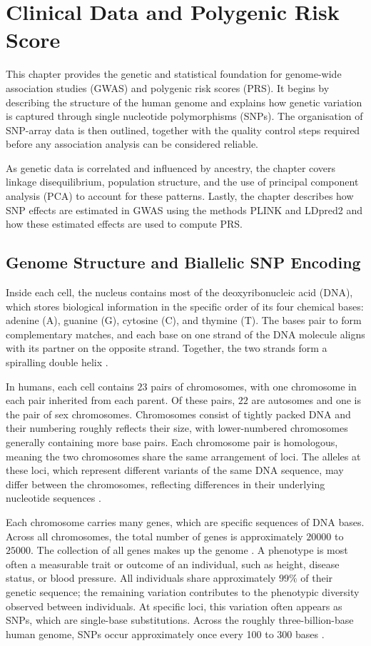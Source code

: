 \chapter{Clinical Data and Polygenic Risk Score}
This chapter provides the genetic and statistical foundation for genome-wide association studies (GWAS) and polygenic risk scores (PRS). It begins by describing the structure of the human genome and explains how genetic variation is captured through single nucleotide polymorphisms (SNPs). The organisation of SNP-array data is then outlined, together with the quality control steps required before any association analysis can be considered reliable.

As genetic data is correlated and influenced by ancestry, the chapter covers linkage disequilibrium, population structure, and the use of principal component analysis (PCA) to account for these patterns. Lastly, the chapter describes how SNP effects are estimated in GWAS using the methods PLINK and LDpred2 and how these estimated effects are used to compute PRS.

\section{Genome Structure and Biallelic SNP Encoding}
Inside each cell, the nucleus contains most of the deoxyribonucleic acid (DNA), which stores biological information in the specific order of its four chemical bases: adenine (A), guanine (G), cytosine (C), and thymine (T). The bases pair to form complementary matches, and each base on one strand of the DNA molecule aligns with its partner on the opposite strand. Together, the two strands form a spiralling double helix \citep[pp. 6-9]{Genetics101}.

In humans, each cell contains $23$ pairs of chromosomes, with one chromosome in each pair inherited from each parent. Of these pairs, $22$ are autosomes and one is the pair of sex chromosomes. Chromosomes consist of tightly packed DNA and their numbering roughly reflects their size, with lower-numbered chromosomes generally containing more base pairs. Each chromosome pair is homologous, meaning the two chromosomes share the same arrangement of loci. The alleles at these loci, which represent different variants of the same DNA sequence, may differ between the chromosomes, reflecting differences in their underlying nucleotide sequences \citep{HomologuosChromosome}.

Each chromosome carries many genes, which are specific sequences of DNA bases. Across all chromosomes, the total number of genes is approximately $20000$ to $25000$. The collection of all genes makes up the genome \citep[pp. 6-9]{Genetics101}. A phenotype is most often a measurable trait or outcome of an individual, such as height, disease status, or blood pressure. All individuals share approximately $99\%$ of their genetic sequence; the remaining variation contributes to the phenotypic diversity observed between individuals. At specific loci, this variation often appears as SNPs, which are single-base substitutions. Across the roughly three-billion-base human genome, SNPs occur approximately once every 100 to 300 bases \citep{Genetics101}.

